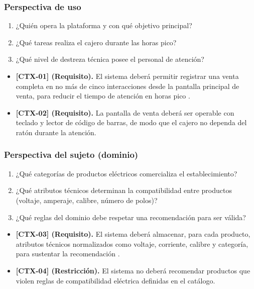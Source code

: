 \documentclass[onecolumn,12pt]{IEEEtran}
\begin{document}
\subsubsection{Perspectiva de uso}
\begin{enumerate}
  \item ¿Qui\'en opera la plataforma y con qu\'e objetivo principal?
  \item ¿Qu\'e tareas realiza el cajero durante las horas pico?
  \item ¿Qu\'e nivel de destreza t\'ecnica posee el personal de atenci\'on?
\end{enumerate}
\begin{itemize}
  \item \textbf{[CTX-01] (Requisito).} El sistema deber\'a permitir registrar una venta completa en no m\'as de cinco interacciones desde la pantalla principal de venta, para reducir el tiempo de atenci\'on en horas pico \cite{mavin2009,pohl2025}.
  \item \textbf{[CTX-02] (Requisito).} La pantalla de venta deber\'a ser operable con teclado y lector de c\'odigo de barras, de modo que el cajero no dependa del rat\'on durante la atenci\'on.
\end{itemize}

\subsubsection{Perspectiva del sujeto (dominio)}
\begin{enumerate}
  \item ¿Qu\'e categor\'ias de productos el\'ectricos comercializa el establecimiento?
  \item ¿Qu\'e atributos t\'ecnicos determinan la compatibilidad entre productos (voltaje, amperaje, calibre, n\'umero de polos)?
  \item ¿Qu\'e reglas del dominio debe respetar una recomendaci\'on para ser v\'alida?
\end{enumerate}
\begin{itemize}
  \item \textbf{[CTX-03] (Requisito).} El sistema deber\'a almacenar, para cada producto, atributos t\'ecnicos normalizados como voltaje, corriente, calibre y categor\'ia, para sustentar la recomendaci\'on \cite{pohl2025}.
  \item \textbf{[CTX-04] (Restricci\'on).} El sistema no deber\'a recomendar productos que violen reglas de compatibilidad el\'ectrica definidas en el cat\'alogo.
\end{itemize}
\end{document}
